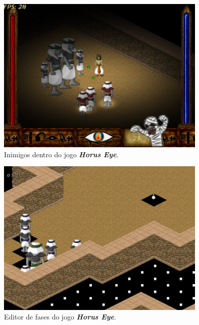 \documentclass[12pt,onecolumn,a4paper]{article}
\begin{document}
        \begin{figure}[htb]
            \centering
            \includegraphics[width=0.9\textwidth]{images/horus_03.png}
            \caption{Inimigos dentro do jogo \textit{\textbf{Horus Eye}}.}
            \label{fig:horus_03}
        \end{figure}
        
        \begin{figure}[htb]
            \centering
            \includegraphics[width=0.9\textwidth]{images/horus_04.png}
            \caption{Editor de fases do jogo \textit{\textbf{Horus Eye}}.}
            \label{fig:horus_04}
        \end{figure}
        
        \clearpage
        
\end{document}
